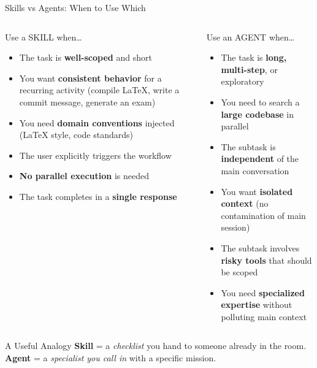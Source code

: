 \documentclass[aspectratio=169,xcolor=dvipsnames]{beamer}
\begin{document}
\begin{frame}{Skills vs Agents: When to Use Which}
    \begin{columns}
        \begin{exampleblock}{Use a SKILL when\ldots}
            \begin{itemize}
                \item The task is \textbf{well-scoped} and short
                \item You want \textbf{consistent behavior} for a recurring activity (compile LaTeX, write a commit message, generate an exam)
                \item You need \textbf{domain conventions} injected (LaTeX style, code standards)
                \item The user explicitly triggers the workflow
                \item \textbf{No parallel execution} is needed
                \item The task completes in a \textbf{single response}
            \end{itemize}
        \end{exampleblock}

        \begin{alertblock}{Use an AGENT when\ldots}
            \begin{itemize}
                \item The task is \textbf{long, multi-step}, or exploratory
                \item You need to search a \textbf{large codebase} in parallel
                \item The subtask is \textbf{independent} of the main conversation
                \item You want \textbf{isolated context} (no contamination of main session)
                \item The subtask involves \textbf{risky tools} that should be scoped
                \item You need \textbf{specialized expertise} without polluting main context
            \end{itemize}
        \end{alertblock}
    \end{columns}
    \vspace{0.2cm}
    \begin{block}{A Useful Analogy}
        \textbf{Skill} = a \emph{checklist} you hand to someone already in the room. \quad \textbf{Agent} = a \emph{specialist you call in} with a specific mission.
    \end{block}
\end{frame}
\end{document}
